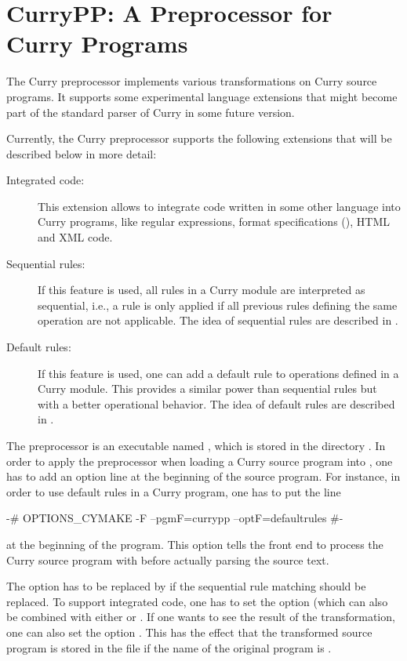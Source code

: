 \section{CurryPP: A Preprocessor for Curry Programs}

The Curry preprocessor 
implements
various transformations on Curry source programs.
It supports some experimental language extensions
that might become part of the standard parser of Curry
in some future version.

Currently, the Curry preprocessor
supports the following extensions that will be described below in more detail:

\begin{description}
\item[Integrated code:]
This extension allows to integrate
code written in some other language into Curry programs,
like regular expressions, format specifications (),
HTML and XML code.
\item[Sequential rules:]
If this feature is used, all rules in a Curry module are
interpreted as sequential, i.e., a rule is only applied
if all previous rules defining the same operation are not applicable.
The idea of sequential rules are described in \cite{AntoyHanus14}.
\item[Default rules:]
If this feature is used, one can add a default rule
to operations defined in a Curry module.
This provides a similar power than sequential rules
but with a better operational behavior.
The idea of default rules are described in \cite{AntoyHanus16PADL}.
\end{description}

The preprocessor is an executable named ,
which is stored in the directory .
In order to apply the preprocessor when loading a Curry source
program into \CYS, one has to add an option line
at the beginning of the source program.
For instance, in order to use default rules in a Curry program,
one has to put the line
\begin{curry}
{-# OPTIONS_CYMAKE -F --pgmF=currypp --optF=defaultrules #-}
\end{curry}
at the beginning of the program.
This option tells the \CYS front end to process the Curry source program
with  before actually parsing the source text.

The option  has to be replaced by
 if the sequential rule matching should be replaced.
To support integrated code, one has to set the option
 (which can also be combined with
either  or .
If one wants to see the result of the transformation, one can
also set the option . This has the effect that the
transformed source program is stored in the file
 if the name of the original program
is .

